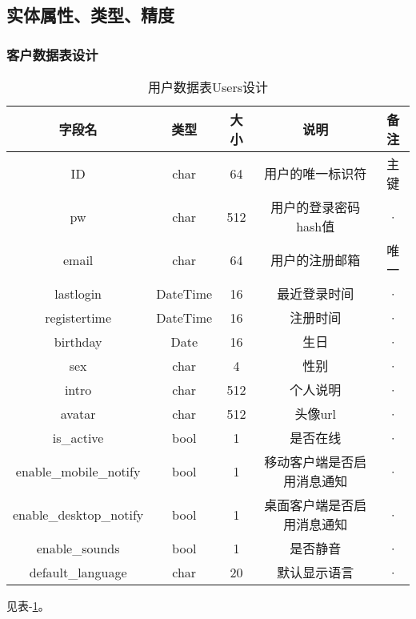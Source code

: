 \subsection{实体属性、类型、精度}
\subsubsection{客户数据表设计}

\begin{table}[htbp]
	\centering
	\caption{用户数据表Users设计} \label{tab:client-database}
	\begin{tabular}{|c|c|c|c|c|}
		\hline
		字段名       & 类型 & 大小 & 说明                 & 备注 \\
		\hline
		ID           & char & 64   & 用户的唯一标识符     & 主键 \\
		\hline
		pw           & char & 512  & 用户的登录密码hash值 & ·    \\
		\hline
		email        & char & 64   & 用户的注册邮箱       & 唯一 \\
		\hline
		lastlogin    & DateTime & 16   & 最近登录时间         & ·    \\
		\hline
		registertime & DateTime & 16   & 注册时间             & ·    \\
		\hline
		birthday     & Date & 16   & 生日                 & ·    \\
		\hline
		sex          & char & 4    & 性别                 & ·    \\
		\hline
		intro        & char & 512  & 个人说明             & ·    \\
		\hline
        avatar       & char & 512  & 头像url              & ·    \\
        \hline
        is\_active   & bool & 1    & 是否在线             & ·    \\
        \hline
        enable\_mobile\_notify & bool & 1 & 移动客户端是否启用消息通知 & · \\
        \hline
        enable\_desktop\_notify & bool & 1 & 桌面客户端是否启用消息通知 & · \\
        \hline
        enable\_sounds & bool & 1  & 是否静音             & ·    \\
        \hline
        default\_language & char & 20 & 默认显示语言       & ·    \\

    \end{tabular}
\end{table}
见表-\ref{tab:client-database}。

